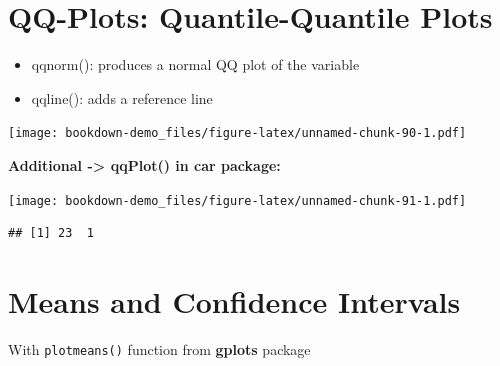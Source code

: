 \documentclass[]{book}
\newenvironment{Shaded}{\begin{snugshade}}{\end{snugshade}}
\newcommand{\KeywordTok}[1]{\textcolor[rgb]{0.13,0.29,0.53}{\textbf{#1}}}
\newcommand{\DataTypeTok}[1]{\textcolor[rgb]{0.13,0.29,0.53}{#1}}
\newcommand{\DecValTok}[1]{\textcolor[rgb]{0.00,0.00,0.81}{#1}}
\newcommand{\StringTok}[1]{\textcolor[rgb]{0.31,0.60,0.02}{#1}}
\newcommand{\CommentTok}[1]{\textcolor[rgb]{0.56,0.35,0.01}{\textit{#1}}}
\newcommand{\OtherTok}[1]{\textcolor[rgb]{0.56,0.35,0.01}{#1}}
\newcommand{\OperatorTok}[1]{\textcolor[rgb]{0.81,0.36,0.00}{\textbf{#1}}}
\newcommand{\NormalTok}[1]{#1}
\providecommand{\tightlist}{%
  \setlength{\itemsep}{0pt}\setlength{\parskip}{0pt}}
\begin{document}
\chapter{QQ-Plots: Quantile-Quantile
Plots}\label{qq-plots-quantile-quantile-plots}

\begin{itemize}
\tightlist
\item
  qqnorm(): produces a normal QQ plot of the variable
\item
  qqline(): adds a reference line
\end{itemize}

\begin{Shaded}
\end{Shaded}

\texttt{[image: bookdown-demo\_files/figure-latex/unnamed-chunk-90-1.pdf]}

\textbf{Additional -\textgreater{} qqPlot() in car package:}

\begin{Shaded}
\end{Shaded}

\texttt{[image: bookdown-demo\_files/figure-latex/unnamed-chunk-91-1.pdf]}

\begin{verbatim}
## [1] 23  1
\end{verbatim}

\chapter{Means and Confidence
Intervals}\label{means-and-confidence-intervals}

With \texttt{plotmeans()} function from \textbf{gplots} package
\end{document}
